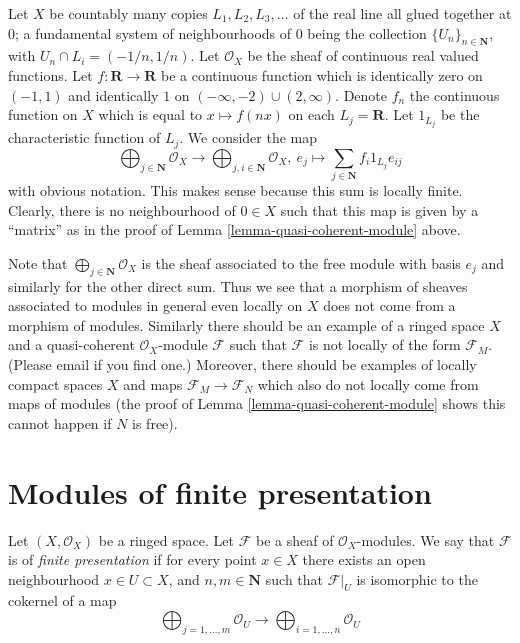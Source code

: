 \begin{example}
\label{example-quasi-coherent}
Let $X$ be countably many copies $L_1, L_2, L_3, \ldots$
of the real line all glued together at $0$; a fundamental
system of neighbourhoods of $0$ being the collection
$\{U_n\}_{n \in \mathbf{N}}$, with $U_n \cap L_i = (-1/n, 1/n)$.
Let $\mathcal{O}_X$ be the sheaf of continuous real valued functions.
Let $f : \mathbf{R} \to \mathbf{R}$ be a continuous function
which is identically zero on $(-1, 1)$ and identically $1$
on $(-\infty, -2) \cup (2, \infty)$. Denote $f_n$ the continuous
function on $X$ which is equal to $x \mapsto f(nx)$ on each
$L_j = \mathbf{R}$. Let $1_{L_j}$ be the characteristic function
of $L_j$. We consider the map
$$
\bigoplus\nolimits_{j \in \mathbf{N}}
\mathcal{O}_X
\longrightarrow
\bigoplus\nolimits_{j, i \in \mathbf{N}}
\mathcal{O}_X, \ 
e_j \longmapsto \sum_{j \in \mathbf{N}} f_i 1_{L_j} e_{ij}
$$
with obvious notation. This makes
sense because this sum is locally finite.
Clearly, there is no neighbourhood of $0 \in X$ such
that this map is given by a ``matrix'' as in the proof
of Lemma \ref{lemma-quasi-coherent-module} above.

\medskip\noindent
Note that $\bigoplus\nolimits_{j \in \mathbf{N}} \mathcal{O}_X$
is the sheaf associated to the free module with basis $e_j$
and similarly for the other direct sum. Thus we see that a
morphism of sheaves associated to modules in general even
locally on $X$ does not come from a morphism of modules.
Similarly there should be an example of a ringed space $X$
and a quasi-coherent $\mathcal{O}_X$-module $\mathcal{F}$
such that $\mathcal{F}$ is not locally of the form $\mathcal{F}_M$.
(Please email if you find one.)
Moreover, there should be examples of locally compact spaces
$X$ and maps $\mathcal{F}_M \to \mathcal{F}_N$ which also do
not locally come from maps of modules (the proof of Lemma
\ref{lemma-quasi-coherent-module} shows this cannot happen
if $N$ is free).
\end{example}












\section{Modules of finite presentation}
\label{section-finite-presentation}


\begin{definition}
\label{definition-finite-presentation}
Let $(X, \mathcal{O}_X)$ be a ringed space.
Let $\mathcal{F}$ be a sheaf of $\mathcal{O}_X$-modules.
We say that $\mathcal{F}$ is of {\it finite presentation}
if for every point $x \in X$ there exists an open neighbourhood
$x\in U \subset X$, and  $n, m \in \mathbf{N}$ such that $\mathcal{F}|_U$
is isomorphic to the cokernel of a map
$$
\bigoplus\nolimits_{j = 1, \ldots, m}
\mathcal{O}_U
\longrightarrow
\bigoplus\nolimits_{i = 1, \ldots, n}
\mathcal{O}_U
$$
\end{definition}

